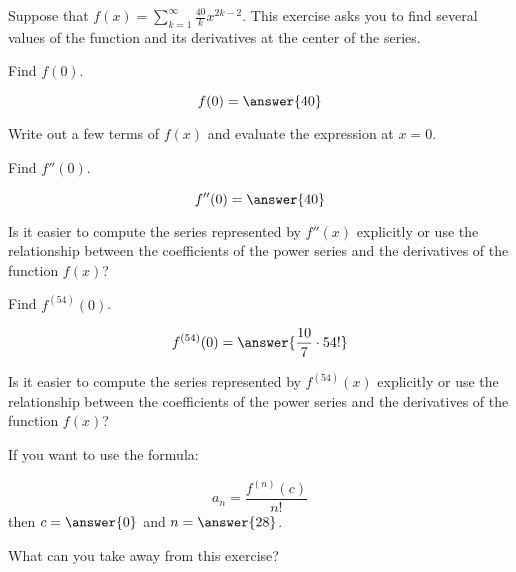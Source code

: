 \documentclass{ximera}
\author{Jim Talamo}
\begin{document}
\begin{exercise}
Suppose that $f(x) = \sum_{k=1}^{\infty} \frac{40}{k}x^{2k-2}$.  This exercise asks you to find several values of the function and its derivatives at the center of the series.

\begin{exercise}
Find $f(0)$.

\[
f(0) = \answer{40}
\]

\begin{hint}
Write out a few terms of $f(x)$ and evaluate the expression at $x=0$.
\end{hint}
\end{exercise}


\begin{exercise}
Find $f''(0)$.

\[
f''(0) = \answer{40}
\]

\begin{hint}
Is it easier to compute the series represented by $f''(x)$ explicitly or use the relationship between the coefficients of the power series and the derivatives of the function $f(x)$?
\end{hint}
\end{exercise}


\begin{exercise}
Find $f^{(54)}(0)$.

\[
f^{(54)}(0) = \answer{\frac{10}{7} \cdot 54!}
\]

\begin{hint}
Is it easier to compute the series represented by $f^{(54)}(x)$ explicitly or use the relationship between the coefficients of the power series and the derivatives of the function $f(x)$?

If you want to use the formula:

\[
a_n = \frac{f^{(n)}(c)}{n!}
\]
then $c=\answer{0}$ and $n=\answer{28}$. 
\end{hint}
\end{exercise}

What can you take away from this exercise?
\end{exercise}
\end{document}
